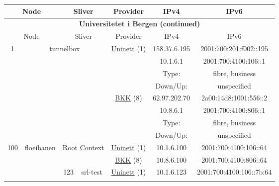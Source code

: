 \begin{small}
\begin{center}
\begin{longtable}{|c|c|c|c|c|c|c|c|}
 \multicolumn{2}{|p{8em}|}{Node} & \multicolumn{2}{|p{8em}|}{Sliver} & \multicolumn{2}{|p{8em}|}{Provider} & IPv4 & IPv6 \\ \hline
\endfirsthead
\hline
 \multicolumn{8}{|c|}{\textbf{Universitetet i Bergen (continued)}} \\ \hline
 \multicolumn{2}{|p{8em}|}{Node} & \multicolumn{2}{|p{8em}|}{Sliver} & \multicolumn{2}{|p{8em}|}{Provider} & IPv4 & IPv6 \\ \hline
\endhead
 \multirow{8}{*}{\tiny{1}} & \multicolumn{3}{|c|}{\multirow{8}{*}{\tiny{tunnelbox}}} & \multicolumn{2}{|c|}{\multirow{4}{*}{\tiny{\href{https://www.uninett.no}{Uninett} (1)}}} & \tiny{158.37.6.195} & \tiny{2001:700:201:f002::195} \\* \cline{7-7}\cline{8-8}
  & \multicolumn{3}{|c|}{} & \multicolumn{2}{|c|}{} & \tiny{10.1.6.1} & \tiny{2001:700:4100:106::1} \\* \cline{7-7}\cline{8-8}
  & \multicolumn{3}{|c|}{} & \multicolumn{2}{|c|}{} & Type: & fibre, business \\* \cline{7-7}\cline{8-8}
  & \multicolumn{3}{|c|}{} & \multicolumn{2}{|c|}{} & Down/Up:  & unspecified \\* \cline{5-5}\cline{6-6}\cline{7-7}\cline{8-8}
  & \multicolumn{3}{|c|}{} & \multicolumn{2}{|c|}{\multirow{4}{*}{\tiny{\href{http://bkk.no}{BKK} (8)}}} & \tiny{62.97.202.70} & \tiny{2a00:14d8:1001:556::2} \\* \cline{7-7}\cline{8-8}
  & \multicolumn{3}{|c|}{} & \multicolumn{2}{|c|}{} & \tiny{10.8.6.1} & \tiny{2001:700:4100:806::1} \\* \cline{7-7}\cline{8-8}
  & \multicolumn{3}{|c|}{} & \multicolumn{2}{|c|}{} & Type: & fibre, business \\* \cline{7-7}\cline{8-8}
  & \multicolumn{3}{|c|}{} & \multicolumn{2}{|c|}{} & Down/Up:  & unspecified \\ \hline
 \multirow{22}{*}{\tiny{100}} & \multicolumn{1}{|l|}{\multirow{22}{*}{\tiny{floeibanen}}} & \multicolumn{2}{|c|}{\multirow{2}{*}{\tiny{Root Context}}} & \multicolumn{2}{|c|}{\tiny{\href{https://www.uninett.no}{Uninett} (1)}} & \tiny{10.1.6.100} & \tiny{2001:700:4100:106::64} \\* \cline{5-5}\cline{6-6}\cline{7-7}\cline{8-8}
  &  & \multicolumn{2}{|c|}{} & \multicolumn{2}{|c|}{\tiny{\href{http://bkk.no}{BKK} (8)}} & \tiny{10.8.6.100} & \tiny{2001:700:4100:806::64} \\* \cline{3-3}\cline{4-4}\cline{5-5}\cline{6-6}\cline{7-7}\cline{8-8}
  &  & \multirow{2}{*}{\tiny{123}} & \multicolumn{1}{|l|}{\multirow{2}{*}{\tiny{srl-test}}} & \multicolumn{2}{|c|}{\tiny{\href{https://www.uninett.no}{Uninett} (1)}} & \tiny{10.1.6.123} & \tiny{2001:700:4100:106::7b:64} \\* \cline{5-5}\cline{6-6}\cline{7-7}\cline{8-8}

\end{longtable}
\end{center}
\end{small}
